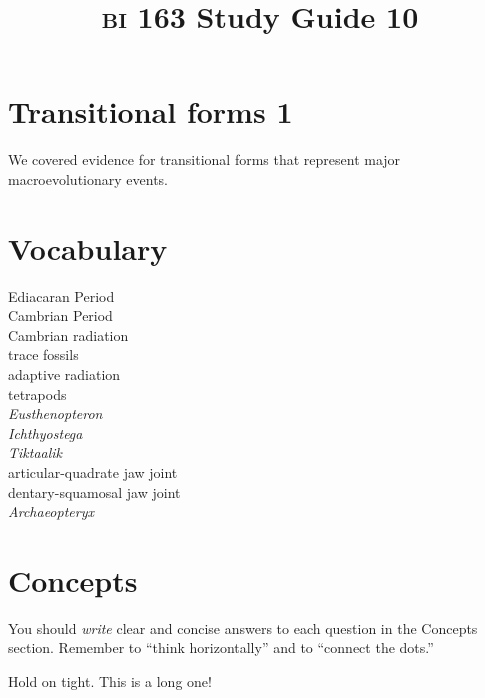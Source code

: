 \documentclass[letterpaper]{tufte-handout}
\title{{\scshape bi} 163 Study Guide 10}
\date{} %
\begin{document}
\maketitle	%

\section*{Transitional forms 1}

We covered evidence for transitional forms that represent major macroevolutionary events.

\section*{Vocabulary}

\vspace{-1\baselineskip}
\begin{multicols}{2}
Ediacaran Period\\
Cambrian Period\\
Cambrian radiation\\
trace fossils \\
adaptive radiation \\
tetrapods \\
\textit{Eusthenopteron} \\
\textit{Ichthyostega} \\
\textit{Tiktaalik} \\
articular-quadrate jaw joint \\
dentary-squamosal jaw joint\\
\textit{Archaeopteryx} \\
\end{multicols}

\section*{Concepts}

You should \emph{write} clear and concise answers to each question in the Concepts section.  Remember to ``think horizontally'' and to ``connect the dots.'' \vspace*{\baselineskip}

Hold on tight. This is a long one!
\end{document}
